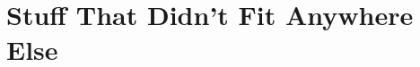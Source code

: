 \documentclass[a4paper,oneside,11pt]{book}
\theoremstyle{definition}
\begin{document}






%





\appendix
\chapter{Stuff That Didn't Fit Anywhere Else}



\end{document}
